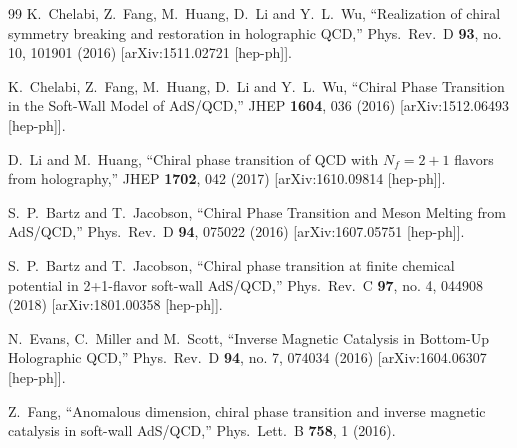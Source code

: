 \documentclass[11pt,a4paper,psfrag]{article}
\begin{document}
\begin{thebibliography}{99}
  K.~Chelabi, Z.~Fang, M.~Huang, D.~Li and Y.~L.~Wu,
  ``Realization of chiral symmetry breaking and restoration in holographic QCD,''
  Phys.\ Rev.\ D {\bf 93}, no. 10, 101901 (2016)
  [arXiv:1511.02721 [hep-ph]].

  K.~Chelabi, Z.~Fang, M.~Huang, D.~Li and Y.~L.~Wu,
  ``Chiral Phase Transition in the Soft-Wall Model of AdS/QCD,''
  JHEP {\bf 1604}, 036 (2016)
  [arXiv:1512.06493 [hep-ph]].

  D.~Li and M.~Huang,
  ``Chiral phase transition of QCD with $N_f=2+1$ flavors from holography,''
  JHEP {\bf 1702}, 042 (2017)
  [arXiv:1610.09814 [hep-ph]].

  S.~P.~Bartz and T.~Jacobson,
  ``Chiral Phase Transition and Meson Melting from AdS/QCD,''
  Phys.\ Rev.\ D {\bf 94}, 075022 (2016)
  [arXiv:1607.05751 [hep-ph]].

  S.~P.~Bartz and T.~Jacobson,
  ``Chiral phase transition at finite chemical potential in 2+1-flavor soft-wall AdS/QCD,''
  Phys.\ Rev.\ C {\bf 97}, no. 4, 044908 (2018)
  [arXiv:1801.00358 [hep-ph]].


  N.~Evans, C.~Miller and M.~Scott,
  ``Inverse Magnetic Catalysis in Bottom-Up Holographic QCD,''
  Phys.\ Rev.\ D {\bf 94}, no. 7, 074034 (2016)
  [arXiv:1604.06307 [hep-ph]].

  Z.~Fang,
  ``Anomalous dimension, chiral phase transition and inverse magnetic catalysis in soft-wall AdS/QCD,''
  Phys.\ Lett.\ B {\bf 758}, 1 (2016).


\end{thebibliography}
\end{document}
